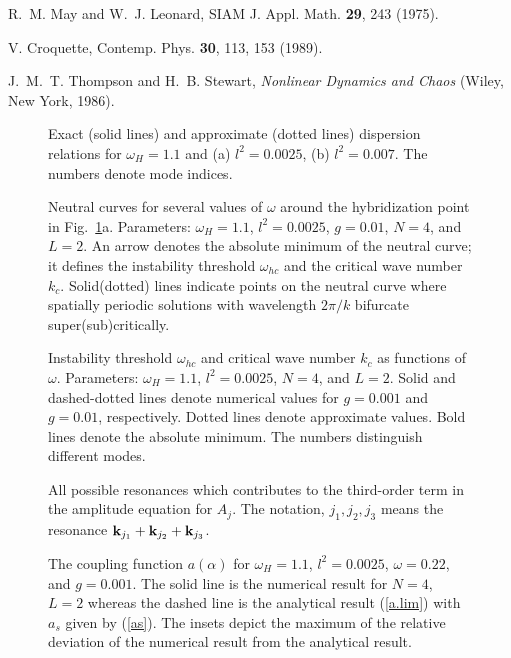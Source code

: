 \begin{references}
R.~M. May and W.~J. Leonard, SIAM J. Appl. Math. {\bf 29}, 243 
(1975).

V. Croquette, Contemp. Phys. {\bf 30}, 113, 153 (1989).

J.~M.~T. Thompson and H.~B. Stewart, {\it Nonlinear Dynamics and
Chaos} (Wiley, New York, 1986).

\end{references}

\begin{figure}
\caption[modes]{\protect\label{f.modes}
Exact (solid lines) and approximate 
(dotted lines) dispersion relations for $\omega_H=1.1$ and (a)
$l^2=0.0025$, (b) $l^2=0.007$. The numbers denote mode indices.}
\end{figure}

\begin{figure}
\caption[neutral curves]{\protect\label{f.nc}
Neutral curves for several values of $\omega$ around the
hybridization point in Fig.~\protect\ref{f.modes}a. Parameters:
$\omega_H=1.1$, $l^2=0.0025$, $g=0.01$, $N=4$, and $L=2$. An arrow
denotes the absolute minimum of the neutral curve; it defines the
instability threshold $\omega_{hc}$ and the critical wave number
$k_c$. Solid(dotted) lines indicate points on the neutral curve where
spatially periodic solutions with wavelength $2\pi/k$ bifurcate
super(sub)critically.}
\end{figure}

\begin{figure}
\caption[threshold]{\protect\label{f.thresh}
Instability threshold $\omega_{hc}$ and critical wave number $k_c$ as
functions of $\omega$. Parameters: $\omega_H=1.1$, $l^2=0.0025$,
$N=4$, and $L=2$. Solid and dashed-dotted lines denote numerical
values for $g=0.001$ and $g=0.01$, respectively. Dotted lines denote
approximate values. Bold lines denote the absolute minimum.  The
numbers distinguish different modes.}
\end{figure}

\begin{figure}
\caption[resonances]{\protect\label{f.res}
All possible resonances which contributes to the third-order term in
the amplitude equation for $A_j$. The notation, $j_1,j_2,j_3$ means
the resonance ${\bf k}_{j_1}+{\bf k}_{j_2}+{\bf k}_{j_3}$.  }
\end{figure}

\begin{figure}
\caption[coupling function]{\protect\label{f.aa}
The coupling function $a(\alpha)$ for $\omega_H=1.1$, $l^2=0.0025$,
$\omega=0.22$, and $g=0.001$. The solid line is the numerical result
for $N=4$, $L=2$ whereas the dashed line is the analytical result
(\ref{a.lim}) with $a_s$ given by (\ref{as}). The insets depict the
maximum of the relative deviation of the numerical result from the
analytical result.}
\end{figure}

